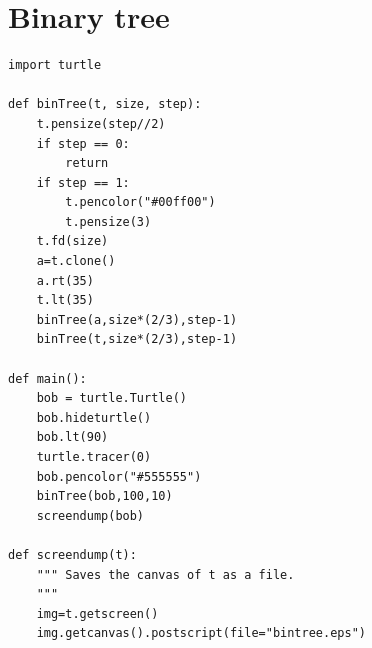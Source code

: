 \documentclass[titlepage]{article}
\begin{document}
\appendix
\section{Binary tree}
\label{app:bintree}
\begin{verbatim}
import turtle

def binTree(t, size, step):
    t.pensize(step//2)
    if step == 0:
        return
    if step == 1:
        t.pencolor("#00ff00")
        t.pensize(3)
    t.fd(size)
    a=t.clone()
    a.rt(35)
    t.lt(35)
    binTree(a,size*(2/3),step-1)
    binTree(t,size*(2/3),step-1)

def main():
    bob = turtle.Turtle()
    bob.hideturtle()
    bob.lt(90)
    turtle.tracer(0)
    bob.pencolor("#555555")
    binTree(bob,100,10)
    screendump(bob)
    
def screendump(t):
    """ Saves the canvas of t as a file.
    """
    img=t.getscreen()
    img.getcanvas().postscript(file="bintree.eps")
\end{verbatim}
\end{document}
